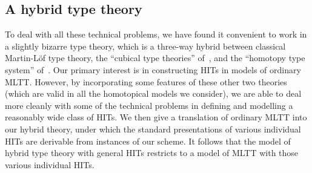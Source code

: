 \documentclass{amsart}
\begin{document}
\subsection{A hybrid type theory}
\label{sec:hybrid-tt}

To deal with all these technical problems, we have found it convenient to work in a slightly bizarre type theory, which is a three-way hybrid between classical Martin-L\"of type theory, the ``cubical type theories'' of~\cite{bch:tt-cubical,ak:cubical,lb:cubical-tt}, and the ``homotopy type system'' of~\cite{vv:hts}.
Our primary interest is in constructing HITs in models of ordinary MLTT.
However, by incorporating some features of these other two theories (which are valid in all the homotopical models we consider), we are able to deal more cleanly with some of the technical problems in defining and modelling a reasonably wide class of HITs.
We then give a translation of ordinary MLTT into our hybrid theory, under which the standard presentations of various individual HITs are derivable from instances of our scheme.  
It follows that the model of hybrid type theory with general HITs restricts to a model of MLTT with those various individual HITs.
\end{document}
